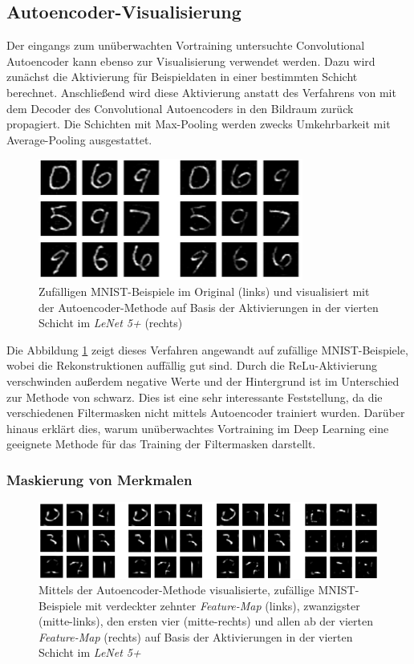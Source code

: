 \subsection{Autoencoder-Visualisierung}		
Der eingangs zum unüberwachten Vortraining untersuchte Convolutional Autoencoder kann ebenso zur Visualisierung verwendet werden. Dazu wird zunächst die Aktivierung für Beispieldaten in einer bestimmten Schicht berechnet. Anschließend wird diese Aktivierung anstatt des Verfahrens von \cite{Zeiler2014} mit dem Decoder des Convolutional Autoencoders in den Bildraum zurück propagiert. Die Schichten mit Max-Pooling werden zwecks Umkehrbarkeit mit Average-Pooling ausgestattet.

\begin{figure}[H]
\centering
\includegraphics[width=0.4\linewidth]{images/6_visualize_mnist_autoenc}
\caption[]{Zufälligen MNIST-Beispiele im Original (links) und visualisiert mit der Autoencoder-Methode auf Basis der Aktivierungen in der vierten Schicht im \textit{LeNet 5+} (rechts)}
\label{fig:6_visualize_mnist_autoenc}
\end{figure}

Die Abbildung \ref{fig:6_visualize_mnist_autoenc} zeigt dieses Verfahren angewandt auf zufällige MNIST-Beispiele, wobei die Rekonstruktionen auffällig gut sind. Durch die ReLu-Aktivierung verschwinden außerdem negative Werte und der Hintergrund ist im Unterschied zur Methode von \cite{Zeiler2014} schwarz. Dies ist eine sehr interessante Feststellung, da die verschiedenen Filtermasken nicht mittels Autoencoder trainiert wurden. Darüber hinaus erklärt dies, warum unüberwachtes Vortraining im Deep Learning eine geeignete Methode für das Training der Filtermasken darstellt. 
	
\subsubsection{Maskierung von Merkmalen}
\begin{figure}
\centering
\includegraphics[width=0.8\linewidth]{images/6_visualize_mnist_autoenc2}
\caption[]{Mittels der Autoencoder-Methode visualisierte, zufällige MNIST-Beispiele mit verdeckter zehnter \textit{Feature-Map} (links), zwanzigster (mitte-links), den ersten vier (mitte-rechts) und allen ab der vierten \textit{Feature-Map} (rechts) auf Basis der Aktivierungen in der vierten Schicht im \textit{LeNet 5+}}
\label{fig:6_visualize_mnist_autoenc2}
\end{figure}

